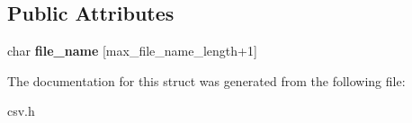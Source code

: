 \subsection*{Public Attributes}
\begin{DoxyCompactItemize}
\item 
char {\bfseries file\+\_\+name} [max\+\_\+file\+\_\+name\+\_\+length+1]\label{structio_1_1error_1_1with__file__name_ac957d5590a8b95517b74eb5bf373a424}

\end{DoxyCompactItemize}


The documentation for this struct was generated from the following file\+:\begin{DoxyCompactItemize}
\item 
csv.\+h\end{DoxyCompactItemize}
